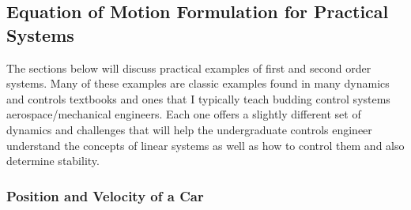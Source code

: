 \subsection{Equation of Motion Formulation for Practical Systems}

The sections below will discuss practical examples of first and second order systems. Many of these examples are classic examples found in many dynamics and controls textbooks and ones that I typically teach budding control systems aerospace/mechanical engineers. Each one offers a slightly different set of dynamics and challenges that will help the undergraduate controls engineer understand the concepts of linear systems as well as how to control them and also determine stability. 

\subsubsection{Position and Velocity of a Car}


